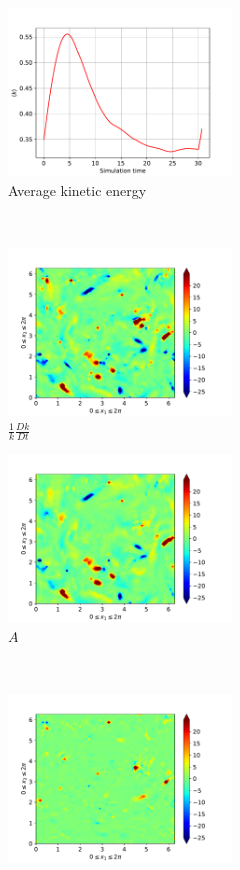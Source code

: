 \begin{figure}[H]
    \begin{subfigure}[H]{0.45\textwidth}
        \includegraphics[height=1.75in]{media/run-cds-65/ke-average1380}
        \caption{Average kinetic energy}
    \end{subfigure}
    ~
    \begin{subfigure}[H]{0.45\textwidth}
        \includegraphics[height=1.75in]{media/run-cds-65/ke-1380}
        \caption{$\frac{1}{k} \frac{D k}{Dt}$}
    \end{subfigure}
    \newline
    \begin{subfigure}{0.45\textwidth}
        \includegraphics[height=1.75in]{media/run-cds-65/A-ke-1380}
        \caption{$A$}
    \end{subfigure}
    ~
    \begin{subfigure}{0.45\textwidth}
        \includegraphics[height=1.75in]{media/run-cds-65/C-ke-1380}

\end{subfigure}
\end{figure}
